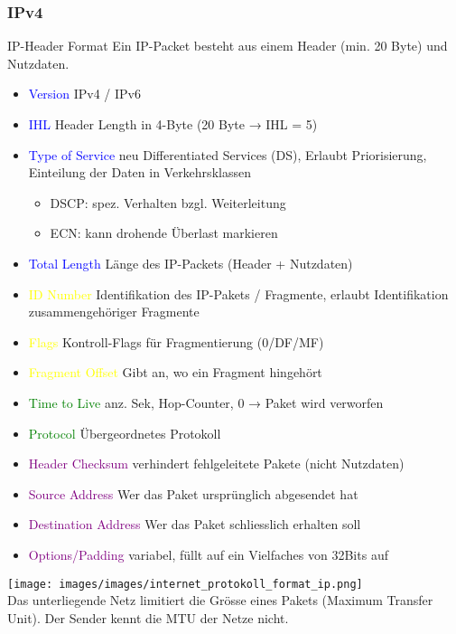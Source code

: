 \subsubsection{IPv4}

\begin{KR}{IP-Header Format}
    Ein IP-Packet besteht aus einem Header (min. 20 Byte) und Nutzdaten.
    \begin{itemize}
        \item \textcolor{blue}{Version} IPv4 / IPv6
        \item \textcolor{blue}{IHL} Header Length in 4-Byte (20 Byte → IHL = 5)
        \item \textcolor{blue}{Type of Service} neu Differentiated Services (DS), Erlaubt Priorisierung, Einteilung der Daten in Verkehrsklassen
        \begin{itemize}
            \item DSCP: spez. Verhalten bzgl. Weiterleitung
            \item ECN: kann drohende Überlast markieren
        \end{itemize}
        \item \textcolor{blue}{Total Length} Länge des IP-Packets (Header + Nutzdaten)
        \item \textcolor{yellow}{ID Number} Identifikation des IP-Pakets / Fragmente, erlaubt Identifikation zusammengehöriger Fragmente
        \item \textcolor{yellow}{Flags} Kontroll-Flags für Fragmentierung (0/DF/MF)
        \item \textcolor{yellow}{Fragment Offset} Gibt an, wo ein Fragment hingehört
        \item \textcolor{green}{Time to Live} anz. Sek, Hop-Counter, 0 → Paket wird verworfen
        \item \textcolor{green}{Protocol} Übergeordnetes Protokoll
        \item \textcolor{purple}{Header Checksum} verhindert fehlgeleitete Pakete (nicht Nutzdaten)
        \item \textcolor{purple}{Source Address} Wer das Paket ursprünglich abgesendet hat
        \item \textcolor{purple}{Destination Address} Wer das Paket schliesslich erhalten soll
        \item \textcolor{purple}{Options/Padding} variabel, füllt auf ein Vielfaches von 32Bits auf
    \end{itemize}
        \texttt{[image: images/images/internet\_protokoll\_format\_ip.png]}\\
    Das unterliegende Netz limitiert die Grösse eines Pakets (Maximum Transfer Unit). Der Sender kennt die MTU der Netze nicht.\\
\end{KR}

